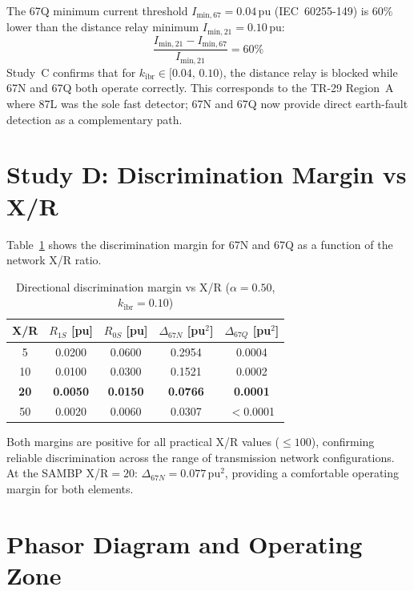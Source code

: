 \documentclass[11pt,a4paper]{article}
\begin{document}
The 67Q minimum current threshold $I_\mathrm{min,67} = 0.04$\,pu (IEC~60255-149)
is 60\% lower than the distance relay minimum $I_\mathrm{min,21} = 0.10$\,pu:
\begin{equation}
  \frac{I_\mathrm{min,21} - I_\mathrm{min,67}}{I_\mathrm{min,21}} = 60\%
\end{equation}
Study~C confirms that for $k_\mathrm{ibr} \in [0.04,\,0.10)$, the distance relay
is blocked while 67N and 67Q both operate correctly.  This corresponds to the
TR-29 Region~A where 87L was the sole fast detector; 67N and 67Q now provide
direct earth-fault detection as a complementary path.

\section{Study D: Discrimination Margin vs X/R}
\label{sec:margin}

Table~\ref{tab:xr} shows the discrimination margin for 67N and 67Q as a function
of the network X/R ratio.

\begin{table}[h]
\centering
\caption{Directional discrimination margin vs X/R ($\alpha=0.50$, $k_\mathrm{ibr}=0.10$)}
\label{tab:xr}
\begin{tabular}{@{}ccccc@{}}
\toprule
X/R & $R_{1S}$ [pu] & $R_{0S}$ [pu] & $\Delta_{67N}$ [pu$^2$] & $\Delta_{67Q}$ [pu$^2$] \\
\midrule
 5  & 0.0200 & 0.0600 & 0.2954 & 0.0004 \\
10  & 0.0100 & 0.0300 & 0.1521 & 0.0002 \\
\textbf{20} & \textbf{0.0050} & \textbf{0.0150} & \textbf{0.0766} & \textbf{0.0001} \\
50  & 0.0020 & 0.0060 & 0.0307 & $<$0.0001 \\
\bottomrule
\end{tabular}
\end{table}

Both margins are positive for all practical X/R values ($\leq 100$), confirming
reliable discrimination across the range of transmission network configurations.
At the SAMBP X/R$=20$: $\Delta_{67N} = 0.077$\,pu$^2$, providing a comfortable
operating margin for both elements.

\section{Phasor Diagram and Operating Zone}
\label{sec:phasor}
\end{document}
